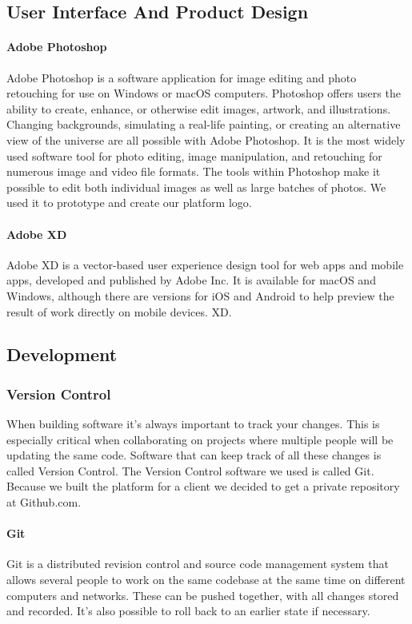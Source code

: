\subsection{User Interface And Product Design}
\paragraph*{Adobe Photoshop}
Adobe Photoshop is a software application for image editing and photo retouching for use on Windows or macOS computers. Photoshop offers users the ability to create, enhance, or otherwise edit images, artwork, and illustrations. Changing backgrounds, simulating a real-life painting, or creating an alternative view of the universe are all possible with Adobe Photoshop. It is the most widely used software tool for photo editing, image manipulation, and retouching for numerous image and video file formats. The tools within Photoshop make it possible to edit both individual images as well as large batches of photos.
We used it to prototype and create our platform logo.
\paragraph*{Adobe XD}
Adobe XD is a vector-based user experience design tool for web apps and mobile apps, developed and published by Adobe Inc. It is available for macOS and Windows, although there are versions for iOS and Android to help preview the result of work directly on mobile devices. XD.






\subsection{Development}
\subsubsection{Version Control}
When building software it’s always important to track your changes. This is especially critical when collaborating on projects where multiple people will be updating the same code. Software that can keep track of all
these changes is called Version Control. The Version Control software we used is called Git. Because we built
the platform for a client we decided to get a private repository at Github.com.

\paragraph*{Git}
Git is a distributed revision control and source code management system that
allows several people to work on the same codebase at the same time on different
computers and networks. These can be pushed together, with all changes stored and
recorded. It’s also possible to roll back to an earlier state if necessary.
